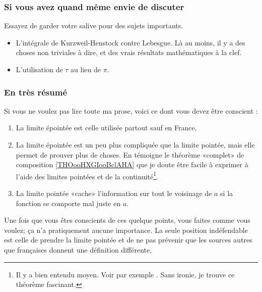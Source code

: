 \subsubsection{Si vous avez quand même envie de discuter}

Essayez de garder votre salive pour des sujets importants.
\begin{itemize}
	\item
	      L'intégrale de Kurzweil-Henstock\cite{BIBooLGJXooZhEXJf} contre Lebesgue. Là au moins, il y a des choses non triviales à dire, et des vrais résultats mathématiques à la clef.
	\item
	      L'utilisation de \( \tau\) au lieu de \( \pi\).
\end{itemize}


\subsubsection{En très résumé}

Si vous ne voulez pas lire toute ma prose, voici ce dont vous devez être conscient :
\begin{enumerate}
	\item
	      La limite épointée est celle utilisée partout sauf en France.
	\item
	      La limite épointée est un peu plus compliquée que la limite pointée, mais elle permet de prouver plus de choses. En témoigne le théorème «complet» de composition \ref{THOooHXGIooBclAHA} que je doute être facile à exprimer à l'aide des limites pointées et de la continuité\footnote{Il y a bien entendu moyen. Voir par exemple \cite{BIBooDAGXooRltbgK}. Sans ironie, je trouve ce théorème fascinant.}.
	\item
	      La limite pointée «cache» l'information sur tout le voisinage de \( a\) si la fonction se comporte mal juste en \( a\).
\end{enumerate}
Une fois que vous êtes conscients de ces quelque points, vous faites comme vous voulez; ça n'a pratiquement aucune importance. La seule position indéfendable est celle de prendre la limite pointée et de ne pas prévenir  que les sources autres que françaises donnent une définition différente.

